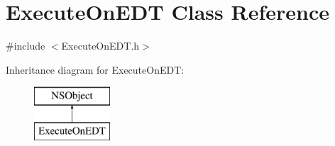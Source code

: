 \hypertarget{interface_execute_on_e_d_t}{
\section{\-Execute\-On\-E\-D\-T \-Class \-Reference}
\label{interface_execute_on_e_d_t}
}


{\ttfamily \#include $<$\-Execute\-On\-E\-D\-T.\-h$>$}

\-Inheritance diagram for \-Execute\-On\-E\-D\-T\-:\begin{figure}[H]
\begin{center}
\leavevmode
\includegraphics[height=2.000000cm]{interface_execute_on_e_d_t}
\end{center}
\end{figure}
